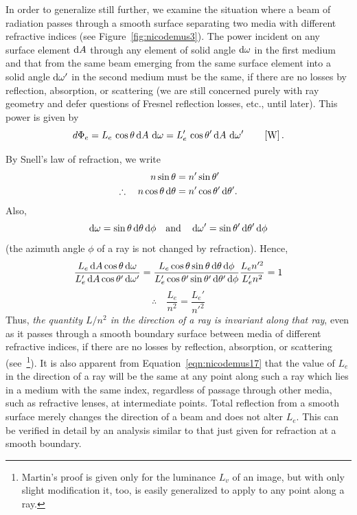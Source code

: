 In order to generalize still further, we examine the situation where a beam of
radiation passes through a smooth surface separating two media with different
refractive indices (see Figure~\ref{fig:nicodemus3}). The power incident on any
surface element $\mathop{}\!\mathrm{d} A$ through any element of solid angle $\mathop{}\!\mathrm{d} \omega$ in the first
medium and that from the same beam emerging from the same surface element into
a solid angle $\mathop{}\!\mathrm{d} \omega'$ in the second medium must be the same, if there are no
losses by reflection, absorption, or scattering (we are still concerned purely
with ray geometry and defer questions of Fresnel reflection losses, etc., until
later). This power is given by
\begin{equation}\label{eqn:nicodemus13}
d\Phi_e = L_e\,\cos\theta \mathop{}\!\mathrm{d} A\, \mathop{}\!\mathrm{d} \omega = L_e'\,\cos\theta' \mathop{}\!\mathrm{d} A\, \mathop{}\!\mathrm{d} \omega'
\qquad \left[\si{\watt}\right].
\end{equation}

By Snell's law of refraction, we write
\begin{align}
n\sin\theta &= n' \sin \theta' \\
\therefore\quad n\cos\theta \mathop{}\!\mathrm{d} \theta &= n' \cos\theta' \mathop{}\!\mathrm{d} \theta'.
\end{align}
Also,
\begin{equation}
\d\omega = \sin\theta\d\theta \d\phi
\quad \textrm{and} \quad
\d\omega' = \sin\theta'\d\theta' \d\phi
\end{equation}
(the azimuth angle $\phi$ of a ray is not changed by refraction). Hence,
\begin{equation*}
\frac{L_e \d A \cos\theta \d\omega}{L_e' \d A \cos\theta' \d\omega'} =
\frac{L_e \cos\theta \sin\theta \d\theta \d\phi}{L_e' \cos\theta' \sin\theta' \d\theta' \d\phi}
\frac{L_e n'^2}{L_e' n^2} = 1
\end{equation*}
\begin{equation}
\therefore\quad \frac{L_e}{n^2} = \frac{L_e'}{n'^2} \label{eqn:nicodemus17}
\end{equation}
Thus, \emph{the quantity $L / n^2$ in the direction of a ray is invariant along
that ray}, even as it passes through a smooth boundary surface between media of
different refractive indices, if there are no losses by reflection, absorption,
or scattering (see~\footnote{\label{note:nicodemus8__}Martin's proof is given
only for the luminance $L_v$ of an image, but with
only slight modification it, too, is easily generalized to apply to any
point along a ray.}). It is also apparent from Equation~\ref{eqn:nicodemus17}
that the value of $L_e$ in the direction of a ray will be the same at any
point along such a ray which lies in a medium with the same index, regardless
of passage through other media, such as refractive lenses, at intermediate
points.
Total reflection from a smooth surface merely changes the direction of a
beam and does not alter $L_e$. This can be verified in detail by an analysis
similar to that just given for refraction at a smooth boundary.

